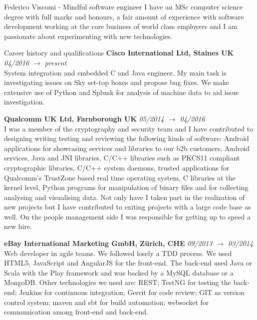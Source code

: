 \documentclass{resume}
\begin{document}
	\begin{rSection}{Federico Viscomi - Mindful software engineer}
		I have an MSc computer science degree with full marks and honours, 
		a fair amount of experience with software development working at the core business of world class employers 
		and I am passionate about experimenting with new technologies.
	\end{rSection}
	\begin{rSection}{Career history and qualifications}
		{\bf Cisco International Ltd, Staines UK} \hfill {\em 04/2016 $\rightarrow$  present}\\
			System integration and embedded C and Java engineer. 
			My main task is investigating issues on Sky set-top boxes and propose bug fixes. 
			We make extensive use of Python and Splunk for analysis of machine data to aid issue investigation.

		{\bf Qualcomm UK Ltd, Farnborough UK} \hfill {\em 05/2014 $\rightarrow$ 04/2016}\\
			I was a member of the cryptography and security team and I have contributed to designing writing testing and reviewing the following kinds of software:
			Android applications for showcasing services and libraries to our b2b customers,
			Android services, 
			Java and JNI libraries, 
			C/C++ libraries such as PKCS11 compliant cryptographic libraries,
			C/C++ system daemons,
			trusted applications for Qualcomm's TrustZone based real time operating system,
			C libraries at the kernel level,
			Python programs for manipulation of binary files and for collecting analysing and visualising data.	
			Not only have I taken part in the realization of new projects but I have contributed to exiting projects with a large code base as well.
			On the people management side I was responsible for getting up to speed a new hire.

		{\bf eBay International Marketing GmbH, Z\"urich, CHE} \hfill {\em 09/2013 $\rightarrow$ 03/2014}\\
			Web developer in agile teams.
			We followed losely a TDD process.
			We used HTML5, JavaScript and AngularJS for the front-end. 
			The back-end used Java or Scala with the Play framework and was backed by a MySQL database or a MongoDB. 
			Other technologies we used are: 
			REST; TestNG for testing the back-end; 
			Jenkins for continuous integration; 
			Gerrit for code review; 
			GIT as version control system; 
			maven and sbt for build automation;
			websocket for communication among front-end and back-end.	  
	    

\end{rSection}
\end{document}
